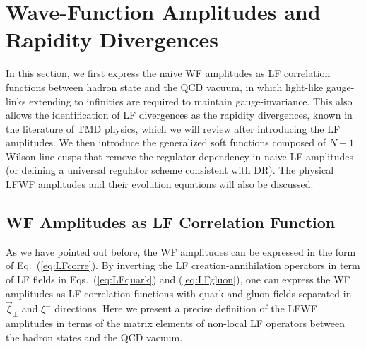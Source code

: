 \documentclass[twocolumn,superscriptaddress,longbibliography,10pt]{revtex4-1}
\begin{document}
\section{Wave-Function Amplitudes and Rapidity Divergences}\label{Sec:LFWF}

In this section, we first express the naive WF amplitudes as LF correlation functions between hadron state and the QCD vacuum, in which light-like gauge-links extending to infinities are required to maintain gauge-invariance.  This also allows the identification of LF divergences as the rapidity divergences, known in the literature of TMD physics, which we will review after introducing the LF amplitudes.  We then introduce the generalized soft functions composed of $N+1$ Wilson-line cusps that remove the regulator dependency in naive LF amplitudes (or defining a universal regulator scheme consistent with
DR). The physical LFWF amplitudes and their evolution equations will also be discussed.

\subsection{WF Amplitudes as LF Correlation Function}

As we have pointed out before, the WF amplitudes can be expressed in the form of Eq.~(\ref{eq:LFcorre}). By inverting the LF creation-annihilation operators in term of LF fields in Eqs.~(\ref{eq:LFquark}) and (\ref{eq:LFgluon}), one can express the WF amplitudes as LF correlation functions with quark and gluon fields separated in $\vec{\xi}_\perp$ and $\xi^-$ directions. Here we present a precise definition of
the LFWF amplitudes in terms of the matrix elements
of non-local LF operators between the hadron states and the QCD vacuum.
\end{document}
